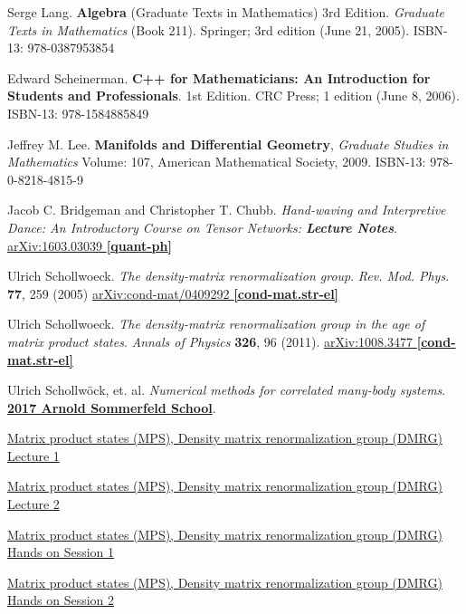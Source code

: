 Serge Lang. \textbf{Algebra} (Graduate Texts in Mathematics) 3rd Edition. \emph{Graduate Texts in Mathematics} (Book 211). Springer; 3rd edition (June 21, 2005). ISBN-13: 978-0387953854

Edward Scheinerman.  \textbf{C++ for Mathematicians: An Introduction for Students and Professionals}. 1st Edition.  CRC Press; 1 edition (June 8, 2006).  ISBN-13: 978-1584885849 


Jeffrey M. Lee. \textbf{Manifolds and Differential Geometry}, \emph{Graduate Studies in Mathematics} Volume: 107, American Mathematical Society, 2009. ISBN-13: 978-0-8218-4815-9

Jacob C. Bridgeman and Christopher T. Chubb.  \emph{Hand-waving and Interpretive Dance: An Introductory Course on Tensor Networks: \textbf{Lecture Notes}}.  \href{https://arxiv.org/abs/1603.03039}{arXiv:1603.03039 \textbf{[quant-ph]}}

Ulrich Schollwoeck.  \emph{The density-matrix renormalization group}.   \emph{Rev. Mod. Phys.} \textbf{77}, 259 (2005)	\href{https://arxiv.org/abs/cond-mat/0409292}{arXiv:cond-mat/0409292 \textbf{[cond-mat.str-el]}}

Ulrich Schollwoeck.  \emph{The density-matrix renormalization group in the age of matrix product states}.  \emph{Annals of Physics} \textbf{326}, 96 (2011).  \href{https://arxiv.org/abs/1008.3477}{arXiv:1008.3477 \textbf{[cond-mat.str-el]}}

Ulrich Schollw\"{o}ck, et. al. \emph{Numerical methods for correlated many-body systems}. \href{https://www.asc.physik.lmu.de/activities/schools/archiv/asc_school_17/index.html}{\textbf{2017 Arnold Sommerfeld School}}. 

\href{https://cast.itunes.uni-muenchen.de/clips/WE0Gf4L6f3/vod/high_quality.mp4}{Matrix product states (MPS), Density matrix renormalization group (DMRG) Lecture 1} 

\href{https://cast.itunes.uni-muenchen.de/clips/1PTFIT1n42/vod/high_quality.mp4}{Matrix product states (MPS), Density matrix renormalization group (DMRG) Lecture 2} 

\href{https://cast.itunes.uni-muenchen.de/clips/uN8yxWC8m9/vod/high_quality.mp4}{Matrix product states (MPS), Density matrix renormalization group (DMRG) Hands on Session 1} 

\href{https://cast.itunes.uni-muenchen.de/clips/xJRe4DD7Fo/vod/high_quality.mp4}{Matrix product states (MPS), Density matrix renormalization group (DMRG) Hands on Session 2} 

